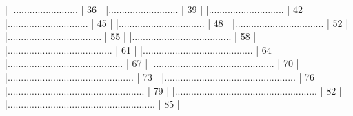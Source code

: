 \documentclass[a4paper,12pt]{article}\usepackage[]{graphicx}\usepackage[]{color}
\begin{document}
\begin{Schunk}
\begin{Soutput}
  |                                                                       
  |........................                                         |  36%
  |                                                                       
  |..........................                                       |  39%
  |                                                                       
  |............................                                     |  42%
  |                                                                       
  |..............................                                   |  45%
  |                                                                       
  |................................                                 |  48%
  |                                                                       
  |.................................                                |  52%
  |                                                                       
  |...................................                              |  55%
  |                                                                       
  |.....................................                            |  58%
  |                                                                       
  |.......................................                          |  61%
  |                                                                       
  |.........................................                        |  64%
  |                                                                       
  |...........................................                      |  67%
  |                                                                       
  |.............................................                    |  70%
  |                                                                       
  |...............................................                  |  73%
  |                                                                       
  |.................................................                |  76%
  |                                                                       
  |...................................................              |  79%
  |                                                                       
  |.....................................................            |  82%
  |                                                                       
  |.......................................................          |  85%
  |                                                                       

\end{Soutput}
\end{Schunk}
\end{document}
